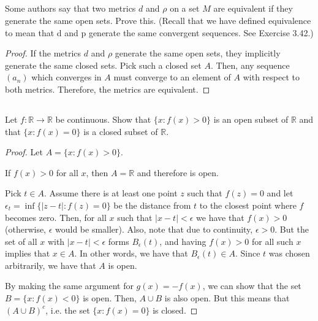 
\subsection{} Some authors say that two metrics $d$ and $\rho$ on a set $M$ are equivalent if they generate the same open sets. Prove this. (Recall that we have defined equivalence to mean that d and p generate the same convergent sequences. See Exercise 3.42.)

\begin{proof}
If the metrics $d$ and $\rho$ generate the same open sets, they implicitly generate the same closed sets. Pick such a closed set $A$. Then, any sequence $(a_n)$ which converges in $A$ must converge to an element of $A$ with respect to both metrics. Therefore, the metrics are equivalent.
\end{proof}



\subsection{} Let $f : \mathbb{R} \rightarrow \mathbb{R}$ be continuous. Show that $\{x  : f(x) > 0\}$ is an open subset of $\mathbb{R}$ and that $\{x : f(x) = 0\}$  is a closed subset of $\mathbb{R}$.

\begin{proof}
Let $A = \{x  : f(x) > 0\}$. 

If $f(x) > 0$ for all $x$, then $A = \mathbb{R}$ and therefore is open.

Pick $t \in A$. Assume there is at least one point $z$ such that $f(z) = 0$ and let $\epsilon_t = \inf\{|z-t| : f(z) = 0\}$ be the distance from $t$ to the closest point where $f$ becomes zero.  Then, for all $x$ such that $|x-t| < \epsilon$ we have that $f(x) > 0$ (otherwise, $\epsilon$ would be smaller). Also, note that due to continuity, $\epsilon > 0$. But the set of all $x$ with $|x-t| < \epsilon$ forms $B_\epsilon(t)$, and having $f(x) > 0$ for all such $x$ implies that $x \in A$. In other words, we have that $B_\epsilon(t) \in A$. Since $t$ was chosen arbitrarily, we have that $A$ is open.

By making the same argument for $g(x) = -f(x)$, we can show that the set $B = \{x  : f(x) < 0\}$ is open. Then, $A \cup B$ is also open. But this means that $(A \cup B)^c$, i.e. the set $\{x  : f(x) = 0\}$ is closed.


\end{proof}


